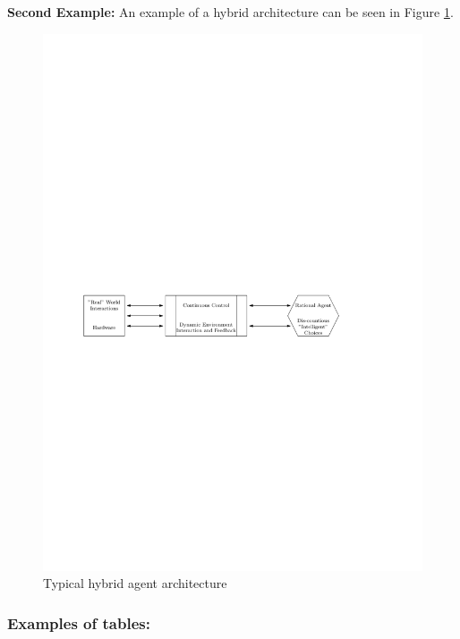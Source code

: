 \textbf{Second Example:}
An example of a hybrid architecture can be seen in Figure \ref{hybride_arch}.
\begin{figure}[ht]
	\centering
  \includegraphics[width=1\textwidth]{figures/hybrid_arch.pdf}
	\caption{Typical hybrid agent architecture \citep{dennis2016}}
	\label{hybride_arch}
\end{figure}



\subsubsection{Examples of tables:}

